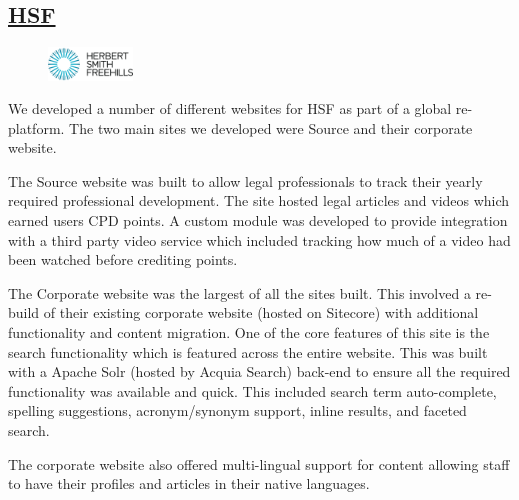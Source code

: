 \documentclass[11pt,a4paper,sans]{moderncv}        %
\begin{document}
  \subsection{\href{https://www.herbertsmithfreehills.com/}{\ac{HSF}}}
    \begin{figure}
      \vspace{-10pt}
      \includegraphics[width=0.2\textwidth]{HSF_logo}
      \vspace{-10pt}
    \end{figure}
    We developed a number of different websites for \ac{HSF} as part of a global re-platform. The two main sites we developed were Source and their corporate website.

    The Source website was built to allow legal professionals to track their yearly required professional development. The site hosted legal articles and videos which earned users \ac{CPD} points. A custom module was developed to provide integration with a third party video service which included tracking how much of a video had been watched before crediting points.

    The Corporate website was the largest of all the sites built. This involved a re-build of their existing corporate website (hosted on Sitecore) with additional functionality and content migration. One of the core features of this site is the search functionality which is featured across the entire website. This was built with a Apache Solr (hosted by Acquia Search) back-end to ensure all the required functionality was available and quick. This included search term auto-complete, spelling suggestions, acronym/synonym support, inline results, and faceted search.

    The corporate website also offered multi-lingual support for content allowing staff to have their profiles and articles in their native languages.


\end{document}
